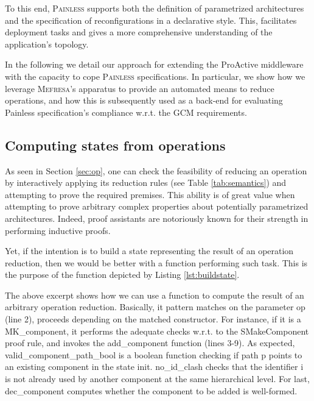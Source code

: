 	To this end, \textsc{Painless} supports both the definition
	of parametrized architectures and the specification of reconfigurations in a declarative style. This,
	facilitates deployment tasks and gives a more comprehensive understanding
	of the application's topology.  

	In the following we detail our approach for extending the ProActive middleware
	with the capacity to cope \textsc{Painless} specifications. In particular, we show how 
	we leverage \textsc{Mefresa}'s apparatus to provide an automated means to reduce
	\textsf{operations}, and how this is subsequently used as a back-end for evaluating \textsf{Painless}
	specification's compliance w.r.t. the \ac{GCM} requirements.
	

\subsection{Computing \textsf{states} from \textsf{operations}}
\label{sub:buildstate}


	As seen in Section \ref{sec:op}, one can check the feasibility
	of reducing an \textsf{operation} by interactively applying	
	its reduction rules (see Table \ref{tab:semantics}) and attempting to prove the required premises.
	This ability is of great value when attempting to prove arbitrary complex
	properties about potentially parametrized architectures. Indeed, proof
	assistants are notoriously known for their strength in performing 
	inductive proofs.

	Yet, if the intention is to build a \textsf{state} representing
	the result of an \textsf{operation} reduction, then we would be better
	with a function performing such task. This is the purpose of the
	function depicted by Listing \ref{lst:buildstate}.
	
	
							
	
	
	\noindent The above excerpt shows how we can use a function to compute the result
	of an arbitrary \textsf{operation} reduction. Basically, it pattern matches on the parameter \textsf{op} (line 2),
	proceeds depending on the matched constructor. For instance, if it is a \textsf{MK\_component},
	it performs the adequate checks w.r.t. to the \textsf{SMakeComponent} proof rule, 
	and invokes the \textsf{add\_component} function (lines 3-9). As expected,
	\textsf{valid\_component\_path\_bool} is a boolean function checking
	if path \textsf{p} points to an existing \textsf{component} in the \textsf{state} \textsf{init}.
	\textsf{no\_id\_clash} checks that the identifier \textsf{i} is not already
	used by another \textsf{component} at the same hierarchical level. For last,
	\textsf{dec\_component} computes whether the \textsf{component} to be
	added is well-formed.	
	
